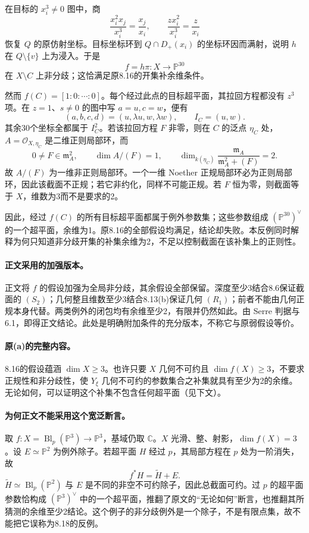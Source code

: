 在目标的 $x_i^3\ne0$ 图中，商
\[
 \frac{x_i^2x_j}{x_i^3}=\frac{x_j}{x_i},\qquad
 \frac{z x_i^2}{x_i^3}=\frac z{x_i}
\]
恢复 $Q$ 的原仿射坐标。目标坐标环到 $Q\cap D_+(x_i)$ 的坐标环因而满射，说明 $h$ 在 $Q\setminus\{v\}$ 上为浸入。于是
\[
 f=h\pi:X\longrightarrow\mathbb P^{30}
\]
在 $X\setminus C$ 上非分歧；这恰满足原8.16的开集补余维条件。

然而 $f(C)=[1:0:\cdots:0]$。每个经过此点的目标超平面，其拉回方程都没有 $z^3$ 项。在 $z=1$、$s\ne0$ 的图中写 $a=u,c=w$，便有
\[
 (a,b,c,d)=(u,\lambda u,w,\lambda w),\qquad
 I_C=(u,w).
\]
其余30个坐标全都属于 $I_C^2$。若该拉回方程 $F$ 非零，则在 $C$ 的泛点 $\eta_C$ 处，$A=\mathcal O_{X,\eta_C}$ 是二维正则局部环，而
\[
 0\ne F\in\mathfrak m_A^2,
 \qquad \dim A/(F)=1,
 \qquad
 \dim_{k(\eta_C)}\frac{\mathfrak m_A}{\mathfrak m_A^2+(F)}=2.
\]
故 $A/(F)$ 为一维非正则局部环。一个一维 Noether 正规局部环必为正则局部环，因此该截面不正规；若它非约化，同样不可能正规。若 $F$ 恒为零，则截面等于 $X$，维数为3而不是要求的2。

因此，经过 $f(C)$ 的所有目标超平面都属于例外参数集；这些参数组成 $(\mathbb P^{30})^\vee$ 的一个超平面，余维为1。原8.16的全部假设均满足，结论却失败。本反例同时解释为何只知道非分歧开集的补集余维为2，不足以控制截面在该补集上的正则性。

\paragraph{正文采用的加强版本。}
正文将 $f$ 的假设加强为全局非分歧，其余假设全部保留。深度至少3结合8.6保证截面的 $(S_2)$；几何整且维数至少3结合8.13(b)保证几何 $(R_1)$；前者不能由几何正规本身代替。两类例外的闭包均有余维至少2，有限并仍然如此。由 Serre 判据与6.1，即得正文结论。此处是明确附加条件的充分版本，不称它与原弱假设等价。

\paragraph{原(a)的完整内容。}
8.16的假设蕴涵 $\dim X\ge3$。也许只要 $X$ 几何不可约且 $\dim f(X)\ge3$，不要求正规性和非分歧性，使 $Y_\xi$ 几何不可约的参数集合之补集就具有至少为2的余维。无论如何，可以证明这个补集不包含任何超平面（见下文）。

\paragraph{为何正文不能采用这个宽泛断言。}
取 $f:X=\operatorname{Bl}_p(\mathbb P^3)\to\mathbb P^3$，基域仍取 $\mathbb C$。$X$ 光滑、整、射影，$\dim f(X)=3$。设 $E\simeq\mathbb P^2$ 为例外除子。若超平面 $H$ 经过 $p$，其局部方程在 $p$ 处为一阶消失，故
\[
 f^*H=\widetilde H+E.
\]
$\widetilde H\simeq\operatorname{Bl}_p(\mathbb P^2)$ 与 $E$ 是不同的非空不可约除子，因此总截面可约。过 $p$ 的超平面参数恰构成 $(\mathbb P^3)^\vee$ 中的一个超平面，推翻了原文的“无论如何”断言，也推翻其所猜测的余维至少2结论。这个例子的非分歧例外是一个除子，不是有限点集，故不能把它误称为8.18的反例。

